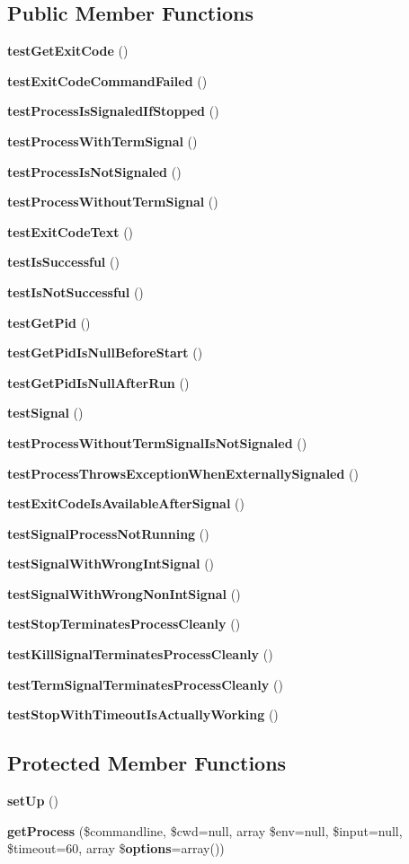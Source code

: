 \subsection*{Public Member Functions}
\begin{DoxyCompactItemize}
\item 
{\bf test\+Get\+Exit\+Code} ()
\item 
{\bf test\+Exit\+Code\+Command\+Failed} ()
\item 
{\bf test\+Process\+Is\+Signaled\+If\+Stopped} ()
\item 
{\bf test\+Process\+With\+Term\+Signal} ()
\item 
{\bf test\+Process\+Is\+Not\+Signaled} ()
\item 
{\bf test\+Process\+Without\+Term\+Signal} ()
\item 
{\bf test\+Exit\+Code\+Text} ()
\item 
{\bf test\+Is\+Successful} ()
\item 
{\bf test\+Is\+Not\+Successful} ()
\item 
{\bf test\+Get\+Pid} ()
\item 
{\bf test\+Get\+Pid\+Is\+Null\+Before\+Start} ()
\item 
{\bf test\+Get\+Pid\+Is\+Null\+After\+Run} ()
\item 
{\bf test\+Signal} ()
\item 
{\bf test\+Process\+Without\+Term\+Signal\+Is\+Not\+Signaled} ()
\item 
{\bf test\+Process\+Throws\+Exception\+When\+Externally\+Signaled} ()
\item 
{\bf test\+Exit\+Code\+Is\+Available\+After\+Signal} ()
\item 
{\bf test\+Signal\+Process\+Not\+Running} ()
\item 
{\bf test\+Signal\+With\+Wrong\+Int\+Signal} ()
\item 
{\bf test\+Signal\+With\+Wrong\+Non\+Int\+Signal} ()
\item 
{\bf test\+Stop\+Terminates\+Process\+Cleanly} ()
\item 
{\bf test\+Kill\+Signal\+Terminates\+Process\+Cleanly} ()
\item 
{\bf test\+Term\+Signal\+Terminates\+Process\+Cleanly} ()
\item 
{\bf test\+Stop\+With\+Timeout\+Is\+Actually\+Working} ()
\end{DoxyCompactItemize}
\subsection*{Protected Member Functions}
\begin{DoxyCompactItemize}
\item 
{\bf set\+Up} ()
\item 
{\bf get\+Process} (\$commandline, \$cwd=null, array \$env=null, \$input=null, \$timeout=60, array \${\bf options}=array())
\end{DoxyCompactItemize}
